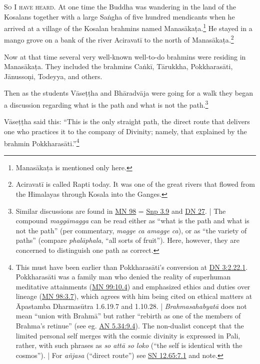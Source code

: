 \documentclass[12pt,openany]{book}%
\newcommand*{\scevam}[1]{\textsc{#1}}
\begin{document}
\scevam{So I have heard. }At one time the Buddha was wandering in the land of the Kosalans together with a large \textsanskrit{Saṅgha} of five hundred mendicants when he arrived at a village of the Kosalan brahmins named \textsanskrit{Manasākaṭa}.\footnote{\textsanskrit{Manasākaṭa} is mentioned only here. } He stayed in a mango grove on a bank of the river \textsanskrit{Aciravatī} to the north of \textsanskrit{Manasākaṭa}.\footnote{\textsanskrit{Aciravatī} is called Rapti today. It was one of the great rivers that flowed from the Himalayas through Kosala into the Ganges. } 

Now at that time several very well-known well-to-do brahmins were residing in \textsanskrit{Manasākaṭa}. They included the brahmins \textsanskrit{Caṅkī}, \textsanskrit{Tārukkha}, \textsanskrit{Pokkharasāti}, \textsanskrit{Jānussoṇi}, Todeyya, and others. 

Then as the students \textsanskrit{Vāseṭṭha} and \textsanskrit{Bhāradvāja} were going for a walk they began a discussion regarding what is the path and what is not the path.\footnote{Similar discussions are found in \href{https://suttacentral.net/mn98/en/sujato}{MN 98} = \href{https://suttacentral.net/snp3.9/en/sujato}{Snp 3.9} and \href{https://suttacentral.net/dn27/en/sujato}{DN 27}. | The compound \textit{\textsanskrit{maggāmagga}} can be read either as “what is the path and what is not the path” (per commentary, \textit{magge ca amagge ca}), or as “the variety of paths” (compare \textit{\textsanskrit{phalāphala}}, “all sorts of fruit”). Here, however, they are concerned to distinguish one path as correct. } 

\textsanskrit{Vāseṭṭha} said this: “This is the only straight path, the direct route that delivers one who practices it to the company of Divinity; namely, that explained by the brahmin \textsanskrit{Pokkharasāti}.”\footnote{This must have been earlier than \textsanskrit{Pokkharasāti}’s conversion at \href{https://suttacentral.net/dn3/en/sujato\#2.22.1}{DN 3:2.22.1}. \textsanskrit{Pokkharasāti} was a family man who denied the reality of superhuman meditative attainments (\href{https://suttacentral.net/mn99/en/sujato\#10.4}{MN 99:10.4}) and emphasized ethics and duties over lineage (\href{https://suttacentral.net/mn98/en/sujato\#3.7}{MN 98:3.7}), which agrees with him being cited on ethical matters at Āpastamba Dharmasūtra 1.6.19.7 and 1.10.28. | \textit{\textsanskrit{Brahmasahabyatā}} does not mean “union with \textsanskrit{Brahmā}” but rather “rebirth as one of the members of Brahma’s retinue” (see eg. \href{https://suttacentral.net/an5.34/en/sujato\#9.4}{AN 5.34:9.4}). The non-dualist concept that the limited personal self merges with the cosmic divinity is expressed in Pali, rather, with such phrases as \textit{so \textsanskrit{attā} so loko} (“the self is identical with the cosmos”). | For \textit{\textsanskrit{añjasa}} (“direct route”) see \href{https://suttacentral.net/sn12.65/en/sujato\#7.1}{SN 12.65:7.1} and note. } 
\end{document}
